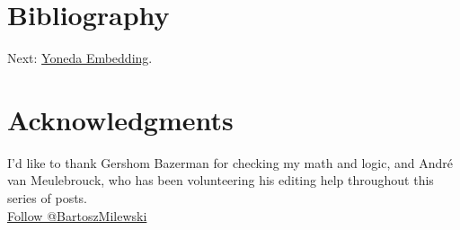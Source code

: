 \section{Bibliography}\label{bibliography}

Next:
\href{https://bartoszmilewski.com/2015/10/28/yoneda-embedding/}{Yoneda
Embedding}.

\section{Acknowledgments}\label{acknowledgments}

I'd like to thank Gershom Bazerman for checking my math and logic, and
André van Meulebrouck, who has been volunteering his editing help
throughout this series of posts.\\
\href{https://twitter.com/BartoszMilewski}{Follow @BartoszMilewski}
